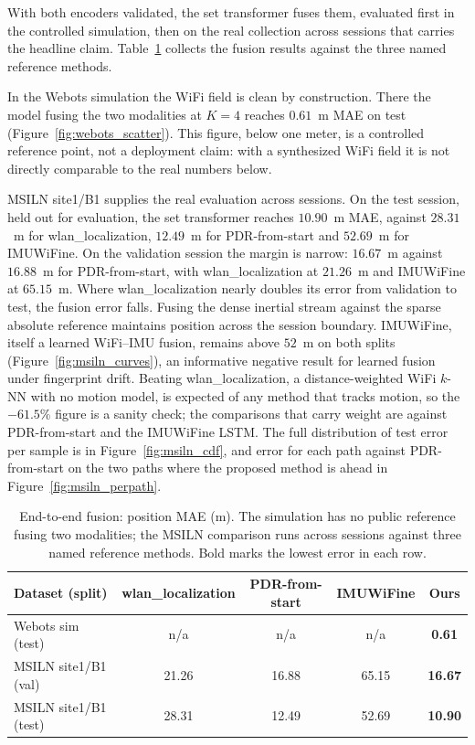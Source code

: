 \noindent
With both encoders validated, the set transformer fuses them, evaluated first in
the controlled simulation, then on the real collection across sessions that
carries the headline claim. Table~\ref{tab:fusion} collects the fusion results
against the three named reference methods.

In the Webots simulation the WiFi field is clean by construction. There the
model fusing the two modalities at $K=4$ reaches $0.61$~m MAE on test
(Figure~\ref{fig:webots_scatter}). This figure, below one meter, is a controlled
reference point, not a deployment claim: with a synthesized WiFi field it is not
directly comparable to the real numbers below.

MSILN site1/B1 supplies the real evaluation across sessions. On the test session,
held out for evaluation, the set transformer reaches $10.90$~m MAE, against
$28.31$~m for wlan\_localization, $12.49$~m for PDR-from-start and $52.69$~m for
IMUWiFine. On the
validation session the margin is narrow: $16.67$~m against $16.88$~m for
PDR-from-start, with wlan\_localization at $21.26$~m and IMUWiFine at $65.15$~m.
Where wlan\_localization nearly doubles its error from validation to test, the
fusion error falls. Fusing the dense inertial stream against the sparse absolute
reference maintains position across the session boundary. IMUWiFine, itself a learned
WiFi--IMU fusion, remains above $52$~m on both splits
(Figure~\ref{fig:msiln_curves}), an informative negative result for learned fusion
under fingerprint drift. Beating wlan\_localization, a distance-weighted WiFi
$k$-NN with no motion model, is expected of any method that tracks motion, so the
$-61.5\%$ figure is a sanity check; the comparisons that carry weight are against
PDR-from-start and the IMUWiFine LSTM. The full distribution of test error per
sample is in Figure~\ref{fig:msiln_cdf}, and error for each path against
PDR-from-start on the two paths where the proposed method is ahead in
Figure~\ref{fig:msiln_perpath}.




\begin{table}[tb]
\caption{End-to-end fusion: position MAE (m). The simulation has no public
  reference fusing two modalities; the MSILN comparison runs across sessions
  against three named reference methods. Bold marks the lowest error in each
  row.}\label{tab:fusion}
\centering
\begin{tabular}{|l|c|c|c|c|}\hline
Dataset (split) & wlan\_localization & PDR-from-start & IMUWiFine & Ours \\ \hline
Webots sim (test) & n/a & n/a & n/a & \textbf{0.61} \\ \hline
MSILN site1/B1 (val) & 21.26 & 16.88 & 65.15 & \textbf{16.67} \\ \hline
MSILN site1/B1 (test) & 28.31 & 12.49 & 52.69 & \textbf{10.90} \\ \hline
\end{tabular}
\end{table}



